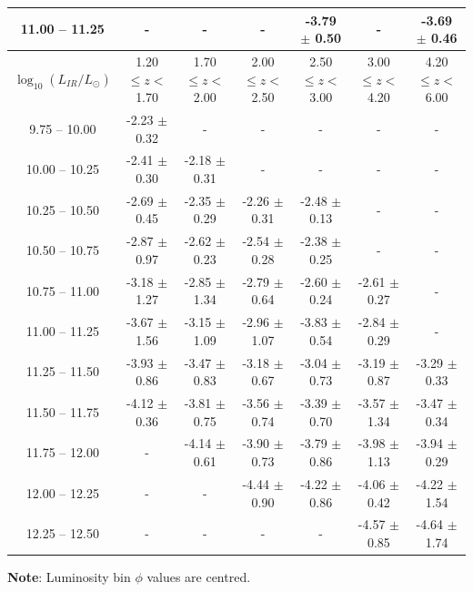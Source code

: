 \begin{landscape}
\begin{table}
\begin{center}
\begin{tabular}{@{}ccccccc@{}}
        11.00 -- 11.25 & -                & -                & -                & -3.79 $\pm$ 0.50 & -                & -3.69 $\pm$ 0.46 \\
        \hline
        $\log_{10}(L_{IR}/L_{\odot})$ & 1.20 $\leq z <$ 1.70 & 1.70 $\leq z <$ 2.00 & 2.00 $\leq z <$ 2.50 & 2.50 $\leq z <$ 3.00 & 3.00 $\leq z <$ 4.20 & 4.20 $\leq z <$ 6.00  \\
        \hline
         9.75 -- 10.00 & -2.23 $\pm$ 0.32 & -                & -                & -                & -                & - \\
        10.00 -- 10.25 & -2.41 $\pm$ 0.30 & -2.18 $\pm$ 0.31 & -                & -                & -                & - \\
        10.25 -- 10.50 & -2.69 $\pm$ 0.45 & -2.35 $\pm$ 0.29 & -2.26 $\pm$ 0.31 & -2.48 $\pm$ 0.13 & -                & - \\
        10.50 -- 10.75 & -2.87 $\pm$ 0.97 & -2.62 $\pm$ 0.23 & -2.54 $\pm$ 0.28 & -2.38 $\pm$ 0.25 & -                & - \\
        10.75 -- 11.00 & -3.18 $\pm$ 1.27 & -2.85 $\pm$ 1.34 & -2.79 $\pm$ 0.64 & -2.60 $\pm$ 0.24 & -2.61 $\pm$ 0.27 & - \\
        11.00 -- 11.25 & -3.67 $\pm$ 1.56 & -3.15 $\pm$ 1.09 & -2.96 $\pm$ 1.07 & -3.83 $\pm$ 0.54 & -2.84 $\pm$ 0.29 & - \\
        11.25 -- 11.50 & -3.93 $\pm$ 0.86 & -3.47 $\pm$ 0.83 & -3.18 $\pm$ 0.67 & -3.04 $\pm$ 0.73 & -3.19 $\pm$ 0.87 & -3.29 $\pm$ 0.33 \\
        11.50 -- 11.75 & -4.12 $\pm$ 0.36 & -3.81 $\pm$ 0.75 & -3.56 $\pm$ 0.74 & -3.39 $\pm$ 0.70 & -3.57 $\pm$ 1.34 & -3.47 $\pm$ 0.34 \\
        11.75 -- 12.00 & -                & -4.14 $\pm$ 0.61 & -3.90 $\pm$ 0.73 & -3.79 $\pm$ 0.86 & -3.98 $\pm$ 1.13 & -3.94 $\pm$ 0.29 \\
        12.00 -- 12.25 & -                & -                & -4.44 $\pm$ 0.90 & -4.22 $\pm$ 0.86 & -4.06 $\pm$ 0.42 & -4.22 $\pm$ 1.54 \\
        12.25 -- 12.50 & -                & -                & -                & -                & -4.57 $\pm$ 0.85 & -4.64 $\pm$ 1.74 \\
        \bottomrule
    \end{tabular}
    \end{center}
    \textbf{Note}: Luminosity bin $\phi$ values are centred.
    \end{table}
\end{landscape}

